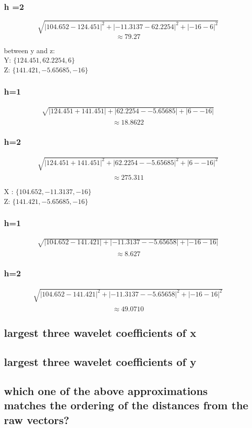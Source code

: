 \documentclass{article}
\begin{document}
\subsubsection{h =2}
\[ \sqrt{ | 104.652-124.451 |^2 + |-11.3137 -62.2254|^2 + |-16-6|^2 } \]
  \[ \approx 79.27 \]


  between y and z:\\ 
Y: $ \{ 124.451, 62.2254, 6\}$  \\
Z: $ \{141.421, -5.65685, -16\} $ \\

\subsubsection{h=1}
\begin{multline*}
	\sqrt{ | 124.451 + 141.451| + | 62.2254 - -5.65685 | + | 6 - -16|}  \\ 
\end{multline*}
\[ \approx 18.8622 \]

\subsubsection{h=2}
\begin{multline*}
	\sqrt{ | 124.451 + 141.451|^2 + | 62.2254 - -5.65685 |^2 + | 6 - -16|^2}  \\ 
\end{multline*}
\[ \approx 275.311 \]


X : $\{104.652, -11.3137, -16\}$ \\
Z: $ \{141.421, -5.65685, -16\} $ \\
\subsubsection{h=1}
\begin{multline*}
	\sqrt{ | 104.652 - 141.421 | + | -11.3137 - -5.65658| + |-16 -16|} \\
\end{multline*}
\[ \approx 8.627 \]

\subsubsection{h=2}
\begin{multline*}
	\sqrt{ | 104.652 - 141.421 |^2 + | -11.3137 - -5.65658|^2 + |-16 -16|^2 } \\
\end{multline*}
\[ \approx 49.0710 \]
\subsection{largest three wavelet coefficients of x}


\subsection{largest three wavelet coefficients of y}


\subsection{which one of the above approximations matches the ordering of the distances from 
the raw vectors?}
\end{document}
